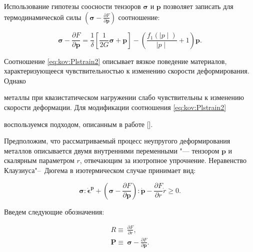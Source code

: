 Использование гипотезы соосности тензоров $\boldsymbol{\sigma}$ и $\boldsymbol{p}$ позволяет записать для термодинамической силы $(\boldsymbol{\sigma}-\frac{\partial F}{\partial{\boldsymbol{p}}})$ соотношение:

\begin{equation}

\boldsymbol{\sigma}-\frac{\partial F}{\partial{\boldsymbol{p}}}=\frac{1}{\delta}\left[\frac{1}{2G}\boldsymbol{\sigma}+\boldsymbol{p}\right]-\left(\frac{f_{1}(\mid p \mid)}{\mid p \mid}+1\right)\boldsymbol{p}. \label{eq:kov:Approxim}

\end{equation}



\smallskip




Соотношение  \eqref{eq:kov:Plstrain2} описывает вязкое поведение материалов, характеризующееся чувствительностью к изменению скорости деформирования. Однако

металлы при квазистатическом нагружении слабо чувствительны к изменению скорости деформации. Для модификации соотношения  \eqref{eq:kov:Plstrain2}

воспользуемся подходом, описанным в работе [].



Предположим, что рассматриваемый процесс неупругого деформирования металлов описывается двумя внутренними переменными "---  тензором $\boldsymbol{p}$  и скалярным параметром $r$, отвечающим за изотропное упрочнение.  Неравенство Клаузиуса"--~Дюгема в изотермическом случае принимает вид:

$$

\boldsymbol{\sigma}:\boldsymbol{\dot{\epsilon}^{p}}+\left(\boldsymbol{\sigma}-\frac{\partial F}{\partial{\boldsymbol{p}}}\right):\dot{\boldsymbol{p}}-\frac{\partial F}{\partial{r}}\dot{r}\geq0.

$$

Введем следующие обозначения:

\begin{gather*}

R\equiv\ \frac{\partial F}{\partial{r}},\\

\boldsymbol{P} \equiv\ \boldsymbol{\sigma}-\frac{\partial F}{\partial{\boldsymbol{p}}}.

\end{gather*}

